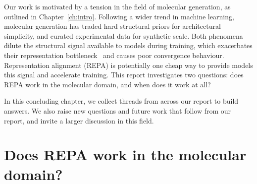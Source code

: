 \documentclass[12pt,a4paper,twoside]{report}
\begin{document}


Our work is motivated by a tension in the field of molecular generation, as outlined in Chapter~\ref{ch:intro}. Following a wider trend in machine learning, molecular generation has traded hard structural priors for architectural simplicity, and curated experimental data for synthetic scale. Both phenomena dilute the structural signal available to models during training, which exacerbates their representation bottleneck~\cite{REPA} and causes poor convergence behaviour. Representation alignment (REPA) is potentially one cheap way to provide models this signal and accelerate training. This report investigates two questions: does REPA work in the molecular domain, and when does it work at all?

In this concluding chapter, we collect threads from across our report to build answers. We also raise new questions and future work that follow from our report, and invite a larger discussion in this field.

\section{Does REPA work in the molecular domain?}
\label{sec:concl-domain}
\end{document}
